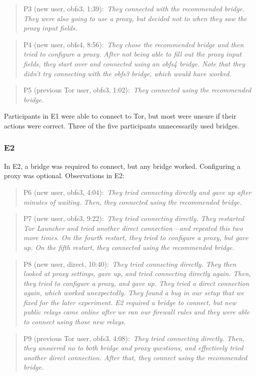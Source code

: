\documentclass[USenglish,oneside,twocolumn]{article}
\newcommand{\pquote}[2]{
\begin{quotation}
\noindent #1:~\textit{#2}
\end{quotation}
}
\begin{document}
\pquote{P3 (new user, obfs3, 1:39)}{They connected with the recommended bridge. They were also going to use a proxy, but decided not to when they saw the proxy input fields.}

\pquote{P4 (new user, obfs4, 8:56)}{They chose the recommended bridge and then tried to configure a proxy. After not being able to fill out the proxy input fields, they start over and connected using an obfs4 bridge. Note that they didn't try connecting with the obfs3 bridge, which would have worked.}

\pquote{P5 (previous Tor user, obfs3, 1:02)}{They connected using the recommended bridge.}

Participants in E1 were able to connect to Tor, but most were unsure if their actions were correct. Three of the five participants unnecessarily used bridges. 

\subsubsection{E2} 
In E2, a bridge was required to connect, but any bridge worked. Configuring a proxy was optional.
Observations in E2: 

\pquote{P6 (new user, obfs3, 4:04)}{They tried connecting directly and gave up after minutes of waiting. Then, they connected using the recommended bridge.}

\pquote{P7 (new user, obfs3, 9:22)}{They tried connecting directly. They restarted Tor Launcher and tried another direct connection---and repeated this two more times. On the fourth restart, they tried to configure a proxy, but gave up. On the fifth restart, they connected using the recommended bridge.}

\pquote{P8 (new user, direct, 10:40)}{They tried connecting directly. They then looked at proxy settings, gave up, and tried connecting directly again. Then, they tried to configure a proxy, and gave up. They tried a direct connection again, which worked unexpectedly. They found a bug in our setup that we fixed for the later experiment. E2 required a bridge to connect, but new public relays came online after we ran our firewall rules and they were able to connect using those new relays. }

\pquote{P9 (previous Tor user, obfs3, 4:08)}{They tried connecting directly. Then, they answered no to both bridge and proxy questions, and effectively tried another direct connection. After that, they connect using the recommended bridge.}
\end{document}
